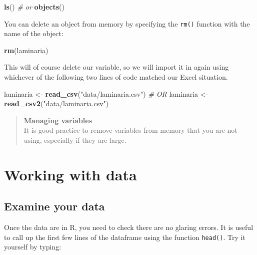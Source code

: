 \documentclass[
]{book}
\newenvironment{Shaded}{\begin{snugshade}}{\end{snugshade}}
\newcommand{\CommentTok}[1]{\textcolor[rgb]{0.56,0.35,0.01}{\textit{#1}}}
\newcommand{\KeywordTok}[1]{\textcolor[rgb]{0.13,0.29,0.53}{\textbf{#1}}}
\newcommand{\NormalTok}[1]{#1}
\newcommand{\StringTok}[1]{\textcolor[rgb]{0.31,0.60,0.02}{#1}}
\begin{document}
\begin{Shaded}
\begin{Highlighting}[]
\KeywordTok{ls}\NormalTok{()}
\CommentTok{\# or}
\KeywordTok{objects}\NormalTok{()}
\end{Highlighting}
\end{Shaded}

You can delete an object from memory by specifying the \texttt{rm()} function with the name of the object:

\begin{Shaded}
\begin{Highlighting}[]
\KeywordTok{rm}\NormalTok{(laminaria)}
\end{Highlighting}
\end{Shaded}

This will of course delete our variable, so we will import it in again using whichever of the following two lines of code matched our Excel situation.

\begin{Shaded}
\begin{Highlighting}[]
\NormalTok{laminaria <{-}}\StringTok{ }\KeywordTok{read\_csv}\NormalTok{(}\StringTok{"data/laminaria.csv"}\NormalTok{)}
\CommentTok{\# OR}
\NormalTok{laminaria <{-}}\StringTok{ }\KeywordTok{read\_csv2}\NormalTok{(}\StringTok{"data/laminaria.csv"}\NormalTok{)}
\end{Highlighting}
\end{Shaded}

\begin{quote}
\textbf{Managing variables}\\
It is good practice to remove variables from memory that you are not using, especially if they are large.
\end{quote}

\hypertarget{working-with-data}{%
\section{Working with data}\label{working-with-data}}

\hypertarget{examine-your-data}{%
\subsection{Examine your data}\label{examine-your-data}}

Once the data are in R, you need to check there are no glaring errors. It is useful to call up the first few lines of the dataframe using the function \texttt{head()}. Try it yourself by typing:
\end{document}
